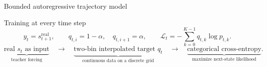\documentclass[aspectratio=169]{beamer}
\begin{document}
\begin{frame}{Bounded autoregressive trajectory model}
{
}

\vspace{0.35cm}

\begin{block}{Training at every time step}
\small
\[
  y_t=s_{t+1}^{\mathrm{real}},
  \qquad
  q_{t,i}=1-\alpha,\quad q_{t,i+1}=\alpha,
  \qquad
  \mathcal{L}_t
  =-\sum_{k=0}^{K-1}q_{t,k}\log p_{t,k}.
\]
\vspace{-2mm}
\[
  \underbrace{\text{real }s_t\text{ as input}}_{\text{teacher forcing}}
  \quad\longrightarrow\quad
  \underbrace{\text{two-bin interpolated target }q_t}_{\text{continuous data on a discrete grid}}
  \quad\longrightarrow\quad
  \underbrace{\text{categorical cross-entropy}}_{\text{maximize next-state likelihood}} .
\]
\end{block}
\end{frame}
\end{document}
